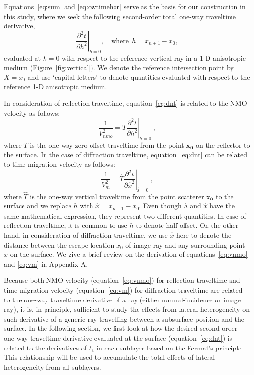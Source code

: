 Equations~\ref{eq:sum} and \ref{eq:owtimehor} serve as the basis for our construction in this study, where we seek the following second-order total one-way traveltime derivative,
\begin{equation}
\label{eq:dnt}
\left.\frac{\partial^2 t}{\partial h^2}\right\rvert_{h=0},\quad\mbox{where}~~h= x_{n+1}-x_0,
\end{equation}
evaluated at $h=0$ with respect to the reference vertical ray in a 1-D anisotropic medium (Figure~\ref{fig:vertical}). We denote the reference intersection point by $X=x_0$ and use `capital letters' to denote quantities evaluated with respect to the reference 1-D anisotropic medium.

In consideration of reflection traveltime, equation~\ref{eq:dnt} is related to the NMO velocity as follows:
\begin{equation}
\label{eq:vnmo}
\frac{1}{V^2_{nmo}} = T \left.\frac{\partial^2 t}{\partial h^2 }\right\rvert_{h=0}~,
\end{equation}
where $T$ is the one-way zero-offset traveltime from the point $\mathbf{x_0}$ on the reflector to the surface. In the case of diffraction traveltime, equation~\ref{eq:dnt} can be related to time-migration velocity as follows:
\begin{equation}
\label{eq:vm}
\frac{1}{V^2_{m}} = \hat{T} \left.\frac{\partial^2 t}{\partial \hat{x}^2}\right\rvert_{\hat{x}=0} ~,
\end{equation}
where $\hat{T}$ is the one-way vertical traveltime from the point scatterer $\mathbf{x_0}$ to the surface and we replace $h$ with $\hat{x} = x_{n+1}-x_0$. Even though $h$ and $\hat{x}$ have the same mathematical expression, they represent two different quantities. In case of reflection traveltime, it is common to use $h$ to denote half-offset. On the other hand, in consideration of diffraction traveltime, we use $\hat{x}$ here to denote the distance between the escape location $x_0$ of image ray and any surrounding point $x$ on the surface. We give a brief review on the derivation of equations~\ref{eq:vnmo} and \ref{eq:vm} in Appendix A.

Because both NMO velocity (equation~\ref{eq:vnmo}) for reflection traveltime and time-migration velocity (equation~\ref{eq:vm}) for diffraction traveltime are related to the one-way traveltime derivative of a ray (either normal-incidence or image ray), it is, in principle, sufficient to study the effects from lateral heterogeneity on such derivative of a generic ray travelling between a subsurface position and the surface. In the following section, we first look at how the desired second-order one-way traveltime derivative evaluated at the surface (equation~\ref{eq:dnt}) is related to the derivatives of $t_k$ in each sublayer based on the Fermat's principle. This relationship will be used to accumulate the total effects of lateral heterogeneity from all sublayers.



